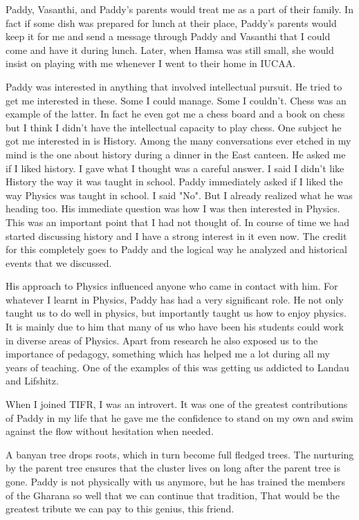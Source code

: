 \documentclass[prd, preprint, longbibliography, 12pt]{revtex4-2}
\begin{document}
Paddy, Vasanthi, and Paddy's parents would treat me as a part of their family. In fact if some dish was prepared for lunch at their place, Paddy's parents would keep it for me and send a message through Paddy and Vasanthi that I could come and have it during lunch. Later, when Hamsa was still small, she would insist on playing with me whenever I went to their home in IUCAA.

Paddy was interested in anything that involved intellectual pursuit. He tried to get me interested in these. Some I could manage. Some I couldn't. Chess was an example of the latter. In fact he even got me a chess board and a book on chess but I think I didn't have the intellectual capacity to play chess. One subject he got me interested in is History. Among the many conversations ever etched in my mind is the one about history during a dinner in the East canteen. He asked me if I liked history. I gave what I thought was a careful answer. I said I didn't like History the way it was taught in school. Paddy immediately asked if I liked the way Physics was taught in school. I said "No". But I already realized what he was heading too. His immediate question was how I was then interested in Physics. This was an important point that I had not thought of. In course of time we had started discussing history and I have a strong interest in it even now. The credit for this completely goes to Paddy and the logical way he analyzed and historical events that we discussed.

His approach to Physics influenced anyone who came in contact with him. For whatever I learnt in Physics, Paddy has had a very significant role. He not only taught us to do well in physics, but importantly taught us how to enjoy physics. It is mainly due to him that many of us who have been his students could work in diverse areas of Physics. Apart from research he also exposed us to the importance of pedagogy, something which has helped me a lot during all my years of teaching. One of the examples of this was getting us addicted to Landau and Lifshitz.

When I joined TIFR, I was an introvert. It was one of the greatest contributions of Paddy in my life that he gave me the confidence to stand on my own and swim against the flow without hesitation when needed.

A banyan tree drops roots, which in turn become full fledged trees. The nurturing by the parent tree ensures that the cluster lives on long after the parent tree is gone. Paddy is not physically with us anymore, but he has trained the members of the Gharana so well that we can continue that tradition, That would be the greatest tribute we can pay to this genius, this friend.
\end{document}
